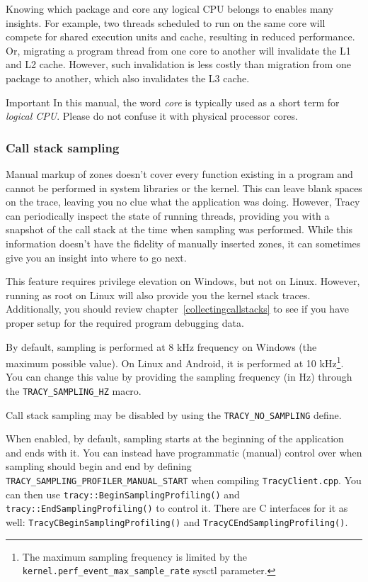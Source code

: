\documentclass[hidelinks,titlepage,a4paper,twoside]{article}
\begin{document}
Knowing which package and core any logical CPU belongs to enables many insights. For example, two threads scheduled to run on the same core will compete for shared execution units and cache, resulting in reduced performance. Or, migrating a program thread from one core to another will invalidate the L1 and L2 cache. However, such invalidation is less costly than migration from one package to another, which also invalidates the L3 cache.

\begin{bclogo}[
noborder=true,
couleur=black!5,
logo=\bcbombe
]{Important}
In this manual, the word \emph{core} is typically used as a short term for \emph{logical CPU}. Please do not confuse it with physical processor cores.
\end{bclogo}

\subsubsection{Call stack sampling}
\label{sampling}

Manual markup of zones doesn't cover every function existing in a program and cannot be performed in system libraries or the kernel. This can leave blank spaces on the trace, leaving you no clue what the application was doing. However, Tracy can periodically inspect the state of running threads, providing you with a snapshot of the call stack at the time when sampling was performed. While this information doesn't have the fidelity of manually inserted zones, it can sometimes give you an insight into where to go next.

This feature requires privilege elevation on Windows, but not on Linux. However, running as root on Linux will also provide you the kernel stack traces. Additionally, you should review chapter~\ref{collectingcallstacks} to see if you have proper setup for the required program debugging data.

By default, sampling is performed at 8 kHz frequency on Windows (the maximum possible value). On Linux and Android, it is performed at 10 kHz\footnote{The maximum sampling frequency is limited by the \texttt{kernel.perf\_event\_max\_sample\_rate} sysctl parameter.}. You can change this value by providing the sampling frequency (in Hz) through the \texttt{TRACY\_SAMPLING\_HZ} macro.

Call stack sampling may be disabled by using the \texttt{TRACY\_NO\_SAMPLING} define.

When enabled, by default, sampling starts at the beginning of the application and ends with it. You can instead have programmatic (manual) control over when sampling should begin and end by defining \texttt{TRACY\_SAMPLING\_PROFILER\_MANUAL\_START} when compiling \texttt{TracyClient.cpp}. You can then use \texttt{tracy::BeginSamplingProfiling()} and \texttt{tracy::EndSamplingProfiling()} to control it. There are C interfaces for it as well: \texttt{TracyCBeginSamplingProfiling()} and \texttt{TracyCEndSamplingProfiling()}.
\end{document}
